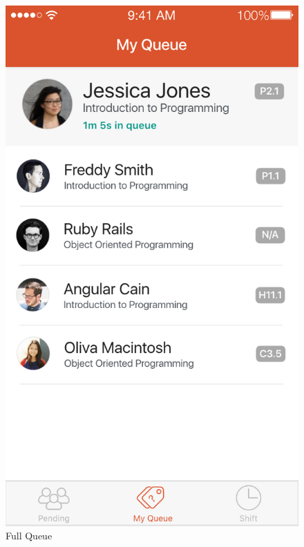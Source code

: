 \documentclass[a4paper,12pt]{article}
\begin{document}
\begin{figure}[p]
\centering
\includegraphics[scale=0.5]{2db52dc2d3.png}
\caption{Full Queue}
\label{4}
\end{figure}
\end{document}
